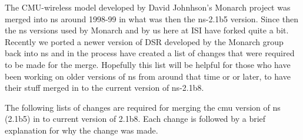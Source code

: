 The CMU-wireless model developed by David Johnhson's Monarch project was merged into ns around 1998-99 in what was then the ns-2.1b5 version. Since then the ns versions used by Monarch and by us here at ISI have forked quite a bit. Recently we ported a newer version of DSR developed by the Monarch group back into ns and in the process have created a list of changes that were required to be made for the merge. Hopefully this list will be helpful for those who have been working on older versions of ns from around that time or or later, to have their stuff merged in to the current version of ns-2.1b8. 

The following lists of changes are required for merging the cmu version of ns (2.1b5) in to current version of 2.1b8. Each change is followed by a brief explanation for why the change was made.

